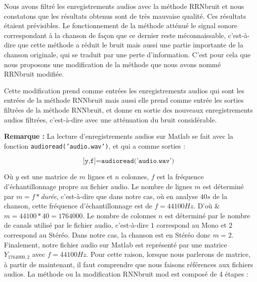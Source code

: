 \documentclass[conference,onecolumn]{IEEEtran}
\begin{document}
Nous avons filtré les enregistrements audios avec la méthode RRNbruit et nous constatons que les résultats obtenus sont de très mauvaise qualité. Ces résultats étaient prévisibles. Le fonctionnement de la méthode atténué le signal sonore correspondant à la chanson de façon que ce dernier reste méconnaissable, c’est-à-dire que cette méthode a réduit le bruit mais aussi une partie importante de la chanson originale, qui se traduit par une perte d’information. C’est pour cela que nous proposons une modification de la méthode que nous avons nommé RRNbruit modifiée.


Cette modification prend comme entrées les enregistrements audios qui sont les entrées de la méthode RNNbruit mais aussi elle prend comme entrée les sorties filtrées de la méthode RNNbruit, et donne en sortie des nouveaux enregistrements audios filtrées, c’est-à-dire avec une atténuation du bruit considérable. 

\textbf{Remarque :} La lecture d’enregistrements audios sur Matlab se fait avec la fonction \texttt{audioread('audio.wav')}, et qui a comme sorties :


\[ \texttt{[y,f]=audioread('audio.wav')}\]

Où $y$ est une matrice de $m$ lignes et $n$ colonnes, $f$ est la fréquence d’échantillonnage propre au fichier audio. Le nombre de lignes $m$ est déterminé par $m=f*$\textit{durée}, c’est-à-dire que dans notre cas, où en analyse $40s$ de la chanson, cette fréquence d’échantillonnage est de $f=44100Hz$. D’où \& $m=44100*40=1764000$. Le nombre de colonnes $n$ est déterminé par le nombre de canals utilisé par le fichier audio, c’est-à-dire $1$ correspond au  Mono et $2$ correspond au Stéréo. Dans notre cas, la chanson est en Stéréo donc $m=2$. Finalement, notre fichier audio sur Matlab est représenté par une matrice $Y_{1764000,2}$ avec $f=44100Hz$. Pour cette raison, lorsque nous parlerons de matrice, à partir de maintenant, il faut comprendre que nous faisons références aux fichiers audios.
La méthode ou la modification RNNbruit mod est composé de 4 étapes :
\end{document}
